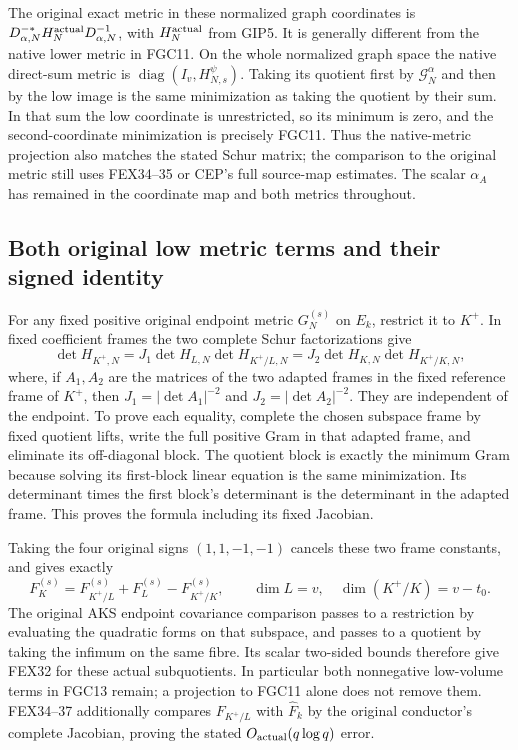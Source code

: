 \documentclass[11pt,a4paper]{article}
\begin{document}
The original exact metric in these normalized graph coordinates is
$D_{\alpha,N}^{-*}H_N^{\rm actual}D_{\alpha,N}^{-1}$, with
$H_N^{\rm actual}$ from GIP5. It is generally different from the
native lower metric in FGC11. On the whole normalized graph space
the native direct-sum metric is $\operatorname{diag}(I_v,H_{N,s}^\psi)$.
Taking its quotient first by $\mathscr G_N^\alpha$ and then by the
low image is the same minimization as taking the quotient by their
sum. In that sum the low coordinate is unrestricted, so its minimum
is zero, and the second-coordinate minimization is precisely FGC11.
Thus the native-metric projection also matches the stated Schur matrix;
the comparison to the original metric still uses FEX34--35 or CEP's
full source-map estimates. The scalar $\alpha_A$ has remained in the
coordinate map and both metrics throughout.

\subsection{Both original low metric terms and their signed identity}

For any fixed positive original endpoint metric $G_N^{(s)}$ on $E_k$,
restrict it to $K^+$. In fixed coefficient frames the two complete
Schur factorizations give
\[
 \det H_{K^+,N}=J_1\det H_{L,N}\det H_{K^+/L,N}
              =J_2\det H_{K,N}\det H_{K^+/K,N},
 \tag{FGC12}
\]
where, if $A_1,A_2$ are the matrices of the two adapted frames in
the fixed reference frame of $K^+$, then
$J_1=|\det A_1|^{-2}$ and $J_2=|\det A_2|^{-2}$.
They are independent of the endpoint. To prove
each equality, complete the chosen subspace frame by fixed quotient
lifts, write the full positive Gram in that adapted frame, and
eliminate its off-diagonal block. The quotient block is exactly
the minimum Gram because solving its first-block linear equation
is the same minimization. Its determinant times the first block's
determinant is the determinant in the adapted frame. This proves
the formula including its fixed Jacobian.

Taking the four original signs $(1,1,-1,-1)$ cancels these two
frame constants, and gives exactly
\[
 F_K^{(s)}=F_{K^+/L}^{(s)}+F_L^{(s)}-F_{K^+/K}^{(s)},\qquad
 \dim L=v,\quad\dim(K^+/K)=v-t_0.
 \tag{FGC13}
\]
The original AKS endpoint covariance comparison passes to a restriction
by evaluating the quadratic forms on that subspace, and passes to a
quotient by taking the infimum on the same fibre. Its scalar two-sided
bounds therefore give FEX32 for these actual subquotients. In particular
both nonnegative low-volume terms in FGC13 remain; a projection to
FGC11 alone does not remove them. FEX34--37 additionally compares
$F_{K^+/L}$ with $\widehat F_k$ by the original conductor's complete
Jacobian, proving the stated $O_{\rm actual}(q\log q)$ error.
\end{document}
